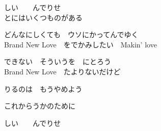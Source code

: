 {しい　　んでりせ
\\

とにはいくつものがある

どんなにしくても　ウソにかってんでゆく
\\

Brand New Love　をでかみしたい　Makin' love

できない　そういうを　にとろう
\\

Brand New Love　たよりないだけど

りるのは　もうやめよう

これからうかのために

しい　　んでりせ

}